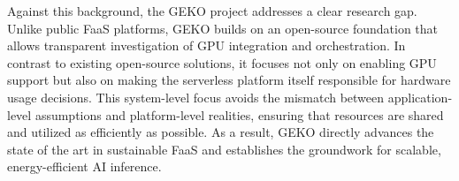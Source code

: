 Against this background, the GEKO project addresses a clear research gap.
Unlike public FaaS platforms, GEKO builds on an open-source foundation that allows transparent investigation of GPU integration and orchestration. 
In contrast to existing open-source solutions, it focuses not only on enabling GPU support but also on making the serverless platform itself responsible for hardware usage decisions. 
This system-level focus avoids the mismatch between application-level assumptions and platform-level realities, ensuring that resources are shared and utilized as efficiently as possible. 
As a result, GEKO directly advances the state of the art in sustainable FaaS and establishes the groundwork for scalable, energy-efficient AI inference.
